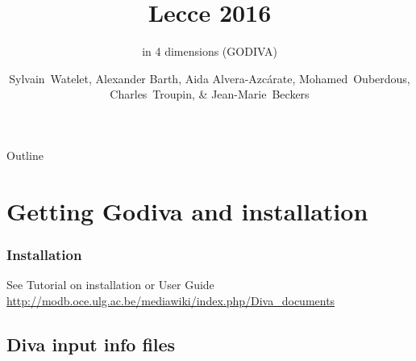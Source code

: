 
\parindent 0cm

\author[Alexander Barth, Aida Alvera-Azc\'{a}rate, Mohamed~Ouberdous, Charles~Troupin, Sylvain~Watelet \& Jean-Marie~Beckers]{Sylvain~Watelet, Alexander Barth, Aida Alvera-Azc\'{a}rate, Mohamed~Ouberdous,\\
 Charles~Troupin, \& Jean-Marie~Beckers}
  
\title[]{\diva Lecce 2016}
\subtitle{\diva in 4 dimensions (GODIVA)}
\date{}


\maketitlepage %





\begin{frame}{Outline}
  \tableofcontents
\end{frame}


\section{Getting Godiva and installation}


\begin{frame}[c]
\frametitle{Installation}
\huge
See Tutorial on installation or User Guide \url{http://modb.oce.ulg.ac.be/mediawiki/index.php/Diva_documents} %


\end{frame}


\subsection{Diva input info files}

